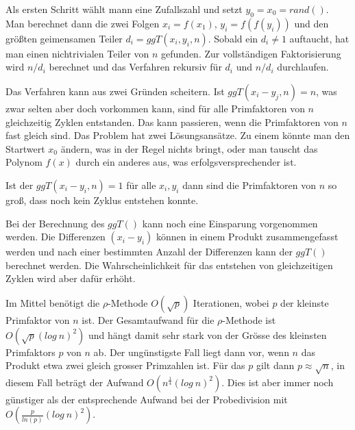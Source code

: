 \documentclass[10pt, bigheadings]{scrartcl}
\begin{document}
Als ersten Schritt wählt mann eine Zufallszahl und setzt $y_0 = x_0 = rand()$.
Man berechnet dann die zwei Folgen $x_i = f(x_1)$,
$y_i = f(f(y_i))$ und den größten geimensamen Teiler  $d_i = ggT(x_i, y_i, n)$.
Sobald ein $d_i \neq 1$ auftaucht, hat man einen nichtrivialen Teiler von $n$
gefunden. Zur vollständigen Faktorisierung wird $n/d_i$ berechnet und das
Verfahren rekursiv für $d_i$ und $n/d_i$ durchlaufen.

Das Verfahren kann aus zwei Gründen scheitern. Ist $ggT(x_i-y_j, n) = n$, was
zwar selten aber doch vorkommen kann, sind für alle Primfaktoren von $n$
gleichzeitig Zyklen entstanden. Das kann passieren, wenn die Primfaktoren
von $n$ fast gleich sind. Das Problem hat zwei Lösungsansätze. Zu einem
könnte man den Startwert $x_0$ ändern, was in der Regel nichts bringt, oder
man tauscht das Polynom $f(x)$ durch ein anderes aus, was erfolgsversprechender
ist.

Ist der $ggT(x_i - y_i , n) = 1$ für alle $x_i, y_i$ dann sind die Primfaktoren
von $n$ so groß, dass noch kein Zyklus entstehen konnte.

Bei der Berechnung des $ggT()$ kann noch eine Einsparung vorgenommen werden.
Die Differenzen $(x_i - y_i)$ können in einem Produkt zusammengefasst werden
und nach einer bestimmten Anzahl der Differenzen kann der $ggT()$ berechnet
werden. Die Wahrscheinlichkeit für das entstehen von gleichzeitigen Zyklen
wird aber dafür erhöht.

Im Mittel benötigt die $\rho$-Methode $O(\sqrt{p})$ Iterationen, wobei $p$
der kleinste Primfaktor von $n$ ist. Der Gesamtaufwand für die
$\rho$-Methode ist $O(\sqrt{p}(log\ n)^2)$ und hängt damit sehr stark von
der Grösse des kleinsten Primfaktors $p$ von $n$ ab. Der ungünstigste Fall
liegt dann vor, wenn $n$ das Produkt etwa zwei gleich grosser
Primzahlen ist. Für das $p$ gilt dann $p\approx\sqrt{n}$, in diesem Fall beträgt
der Aufwand $O(n^{\frac{1}{4}}(log\ n)^2)$. Dies ist aber immer noch günstiger
als der entsprechende Aufwand bei der Probedivision mit
$O(\frac{p}{ln(p)}(log\ n)^2)$.
\end{document}
